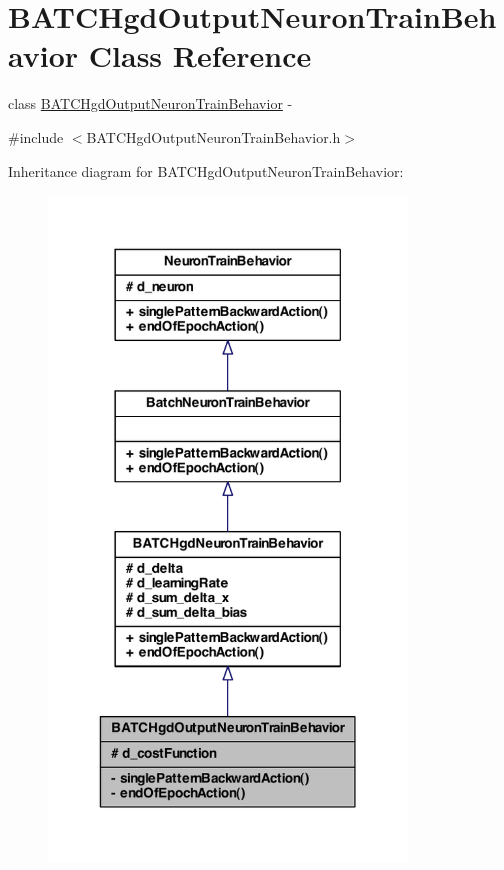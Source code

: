 \hypertarget{class_b_a_t_c_hgd_output_neuron_train_behavior}{
\section{BATCHgdOutputNeuronTrainBehavior Class Reference}
\label{class_b_a_t_c_hgd_output_neuron_train_behavior}
}


class \hyperlink{class_b_a_t_c_hgd_output_neuron_train_behavior}{BATCHgdOutputNeuronTrainBehavior} -\/  




{\ttfamily \#include $<$BATCHgdOutputNeuronTrainBehavior.h$>$}



Inheritance diagram for BATCHgdOutputNeuronTrainBehavior:
\nopagebreak
\begin{figure}[H]
\begin{center}
\leavevmode
\includegraphics[width=270pt]{class_b_a_t_c_hgd_output_neuron_train_behavior__inherit__graph}
\end{center}
\end{figure}


